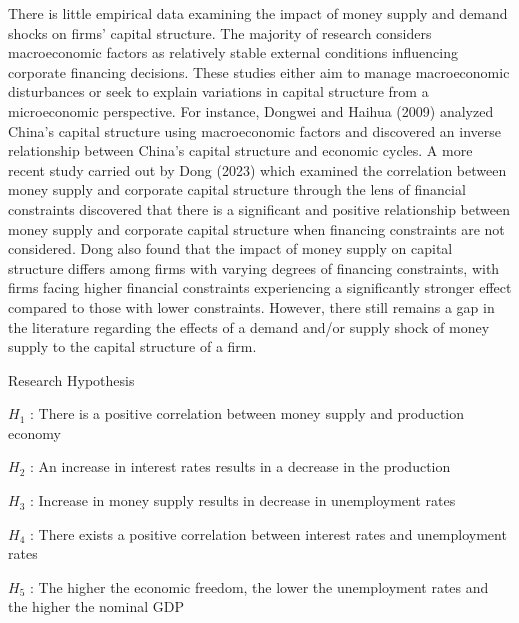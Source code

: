 \documentclass[11pt]{article}
\begin{document}
There is little empirical data examining the impact of money supply and
demand shocks on firms' capital structure. The majority of research
considers macroeconomic factors as relatively stable external conditions
influencing corporate financing decisions. These studies either aim to
manage macroeconomic disturbances or seek to explain variations in
capital structure from a microeconomic perspective. For instance,
Dongwei and Haihua (2009) analyzed China's capital structure using
macroeconomic factors and discovered an inverse relationship between
China's capital structure and economic cycles. A more recent study
carried out by Dong (2023) which examined the correlation between money
supply and corporate capital structure through the lens of financial
constraints discovered that there is a significant and positive
relationship between money supply and corporate capital structure when
financing constraints are not considered. Dong also found that the
impact of money supply on capital structure differs among firms with
varying degrees of financing constraints, with firms facing higher
financial constraints experiencing a significantly stronger effect
compared to those with lower constraints. However, there still remains a
gap in the literature regarding the effects of a demand and/or supply
shock of money supply to the capital structure of a firm.

Research Hypothesis

\(H_1\) : There is a positive correlation between money supply and
production economy

\(H_2\) : An increase in interest rates results in a decrease in the
production

\(H_3\) : Increase in money supply results in decrease in unemployment
rates

\(H_4\) : There exists a positive correlation between interest rates and
unemployment rates

\(H_5\) : The higher the economic freedom, the lower the unemployment
rates and the higher the nominal GDP
\end{document}
